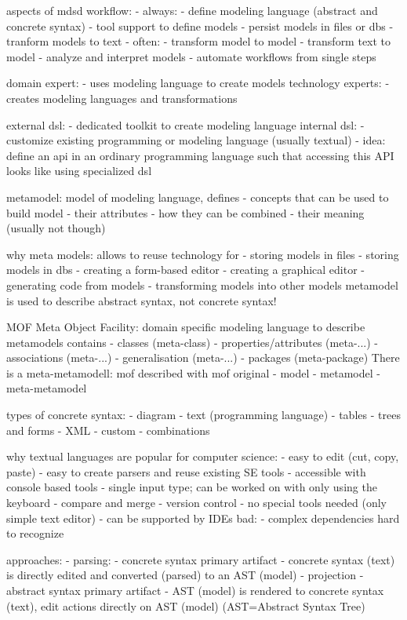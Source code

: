 aspects of mdsd workflow:
- always:
  - define modeling language (abstract and concrete syntax)
  - tool support to define models
  - persist models in files or dbs
  - tranform models to text
- often:
  - transform model to model
  - transform text to model
  - analyze and interpret models
  - automate workflows from single steps


domain expert:
- uses modeling language to create models
technology experts:
- creates modeling languages and transformations

external dsl:
- dedicated toolkit to create modeling language
internal dsl:
- customize existing programming or modeling language (usually textual)
- idea: define an api in an ordinary programming language such that accessing this API looks like using specialized dsl

metamodel: model of modeling language, defines
- concepts that can be used to build model
- their attributes
- how they can be combined
- their meaning (usually not though)

why meta models: allows to reuse technology for
- storing models in files
- storing models in dbs
- creating a form-based editor
- creating a graphical editor
- generating code from models
- transforming models into other models
metamodel is used to describe abstract syntax, not concrete syntax!

MOF Meta Object Facility: domain specific modeling language to describe metamodels
contains
- classes (meta-class)
- properties/attributes (meta-...)
- associations (meta-...)
- generalisation (meta-...)
- packages (meta-package)
There is a meta-metamodell: mof described with mof
original - model - metamodel - meta-metamodel

types of concrete syntax:
- diagram
- text (programming language)
- tables
- trees and forms
- XML
- custom
- combinations

why textual languages are popular for computer science:
- easy to edit (cut, copy, paste)
- easy to create parsers and reuse existing SE tools
- accessible with console based tools
- single input type; can be worked on with only using the keyboard
- compare and merge
- version control
- no special tools needed (only simple text editor)
- can be supported by IDEs
bad:
- complex dependencies hard to recognize

approaches:
- parsing:
  - concrete syntax primary artifact
  - concrete syntax (text) is directly edited and converted (parsed) to an AST (model)
- projection
  - abstract syntax primary artifact
  - AST (model) is rendered to concrete syntax (text), edit actions directly on AST (model) (AST=Abstract Syntax Tree)

